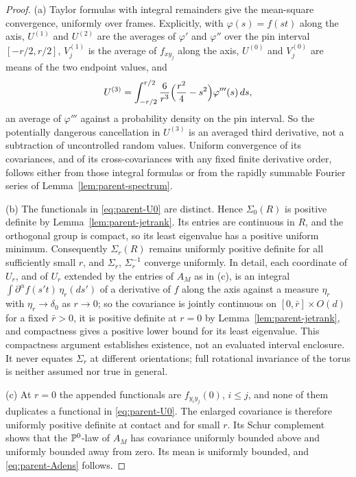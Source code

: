 \begin{proof}
(a) Taylor formulas with integral remainders give the mean-square convergence, uniformly over frames. Explicitly, with $\varphi(s)=f(st)$ along the axis, $U^{(1)}$ and $U^{(2)}$ are the averages of $\varphi'$ and $\varphi''$ over the pin interval $[-r/2,r/2]$, $V^{(1)}_j$ is the average of $f_{xy_j}$ along the axis, $U^{(0)}$ and $V^{(0)}_j$ are means of the two endpoint values, and
\[
U^{(3)}=\int_{-r/2}^{r/2}\frac6{r^3}\Bigl(\frac{r^2}4-s^2\Bigr)\varphi'''(s)\,ds,
\]
an average of $\varphi'''$ against a probability density on the pin interval. So the potentially dangerous cancellation in $U^{(3)}$ is an averaged third derivative, not a subtraction of uncontrolled random values. Uniform convergence of its covariances, and of its cross-covariances with any fixed finite derivative order, follows either from those integral formulas or from the rapidly summable Fourier series of Lemma~\ref{lem:parent-spectrum}.

(b) The functionals in \eqref{eq:parent-U0} are distinct. Hence $\Sigma_0(R)$ is positive definite by Lemma~\ref{lem:parent-jetrank}. Its entries are continuous in $R$, and the orthogonal group is compact, so its least eigenvalue has a positive uniform minimum. Consequently $\Sigma_r(R)$ remains uniformly positive definite for all sufficiently small $r$, and $\Sigma_r$, $\Sigma_r^{-1}$ converge uniformly. In detail, each coordinate of $U_r$, and of $U_r$ extended by the entries of $A_M$ as in (c), is an integral $\int\partial^\alpha f(s't)\,\eta_r(ds')$ of a derivative of $f$ along the axis against a measure $\eta_r$ with $\eta_r\to\delta_0$ as $r\to0$; so the covariance is jointly continuous on $[0,\bar r]\times O(d)$ for a fixed $\bar r>0$, it is positive definite at $r=0$ by Lemma~\ref{lem:parent-jetrank}, and compactness gives a positive lower bound for its least eigenvalue. This compactness argument establishes existence, not an evaluated interval enclosure. It never equates $\Sigma_r$ at different orientations; full rotational invariance of the torus is neither assumed nor true in general.

(c) At $r=0$ the appended functionals are $f_{y_iy_j}(0)$, $i\le j$, and none of them duplicates a functional in \eqref{eq:parent-U0}. The enlarged covariance is therefore uniformly positive definite at contact and for small $r$. Its Schur complement shows that the $\mathbb P^0$-law of $A_M$ has covariance uniformly bounded above and uniformly bounded away from zero. Its mean is uniformly bounded, and \eqref{eq:parent-Adens} follows.
\end{proof}

